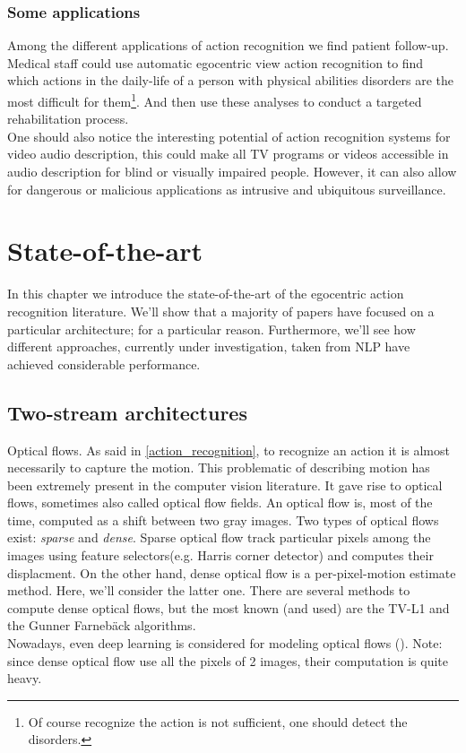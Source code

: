 \documentclass[12pt, a4paper]{report}
\begin{document}
	\subsection*{Some applications}
	Among the different applications of action recognition we find patient follow-up.
	Medical staff could use automatic egocentric view action recognition to find which actions in the daily-life of a person with physical abilities disorders are the most difficult for them\footnote{Of course recognize the action is not sufficient, one should detect the disorders.}.
	And then use these analyses to conduct a targeted rehabilitation process.\\
	One should also notice the interesting potential of action recognition systems for video audio description, this could make all TV programs or videos accessible in audio description for blind or visually impaired people.
	However, it can also allow for dangerous or malicious applications as intrusive and ubiquitous surveillance.

	\chapter{State-of-the-art}
	In this chapter we introduce the state-of-the-art of the egocentric action recognition literature.
	We'll show that a majority of papers have focused on a particular architecture; for a particular reason.
	Furthermore, we'll see how different approaches, currently under investigation, taken from NLP have achieved considerable performance.

	\section{Two-stream architectures}\label{twostream}
	{\boldtahomafont Optical flows}. As said in \ref{action_recognition}, to recognize an action it is almost necessarily to capture the motion.
	This problematic of describing motion has been extremely present in the computer vision literature.
	It gave rise to optical flows, sometimes also called optical flow fields.
	An optical flow is, most of the time, computed as a shift between two gray images.
	Two types of optical flows exist: {\itshape sparse} and {\itshape dense}.
	Sparse optical flow track particular pixels among the images using feature selectors(e.g. Harris corner detector) and computes their displacment.
	On the other hand, dense optical flow is a per-pixel-motion estimate method.
	Here, we'll consider the latter one.
	There are several methods to compute dense optical flows, but the most known (and used) are the TV-L1 \cite{sanchez} and the Gunner Farnebäck \cite{farneback} algorithms.\\  %
	Nowadays, even deep learning is considered for modeling optical flows (\cite{hur}).
	Note: since dense optical flow use all the pixels of 2 images, their computation is quite heavy.\\
\end{document}
